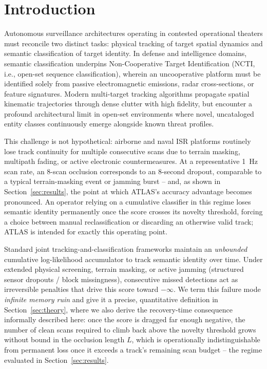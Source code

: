 \documentclass[conference]{IEEEtran}
\begin{document}
\section{Introduction}
\label{sec:introduction}
Autonomous surveillance architectures operating in contested operational theaters must reconcile two distinct tasks: physical tracking of target spatial dynamics and semantic classification of target identity. In defense and intelligence domains, semantic classification underpins Non-Cooperative Target Identification (NCTI, i.e., open-set sequence classification), wherein an uncooperative platform must be identified solely from passive electromagnetic emissions, radar cross-sections, or feature signatures. Modern multi-target tracking algorithms propagate spatial kinematic trajectories through dense clutter with high fidelity, but encounter a profound architectural limit in open-set environments where novel, uncataloged entity classes continuously emerge alongside known threat profiles.

This challenge is not hypothetical: airborne and naval ISR platforms routinely lose track continuity for multiple consecutive scans due to terrain masking, multipath fading, or active electronic countermeasures. At a representative 1~Hz scan rate, an 8-scan occlusion corresponds to an 8-second dropout, comparable to a typical terrain-masking event or jamming burst -- and, as shown in Section~\ref{sec:results}, the point at which ATLAS's accuracy advantage becomes pronounced. An operator relying on a cumulative classifier in this regime loses semantic identity permanently once the score crosses its novelty threshold, forcing a choice between manual reclassification or discarding an otherwise valid track; ATLAS is intended for exactly this operating point.

Standard joint tracking-and-classification frameworks maintain an \emph{unbounded} cumulative log-likelihood accumulator to track semantic identity over time. Under extended physical screening, terrain masking, or active jamming (structured sensor dropouts / block missingness), consecutive missed detections act as irreversible penalties that drive this score toward $-\infty$. We term this failure mode \emph{infinite memory ruin} and give it a precise, quantitative definition in Section~\ref{sec:theory}, where we also derive the recovery-time consequence informally described here: once the score is dragged far enough negative, the number of clean scans required to climb back above the novelty threshold grows without bound in the occlusion length $L$, which is operationally indistinguishable from permanent loss once it exceeds a track's remaining scan budget -- the regime evaluated in Section~\ref{sec:results}.
\end{document}
